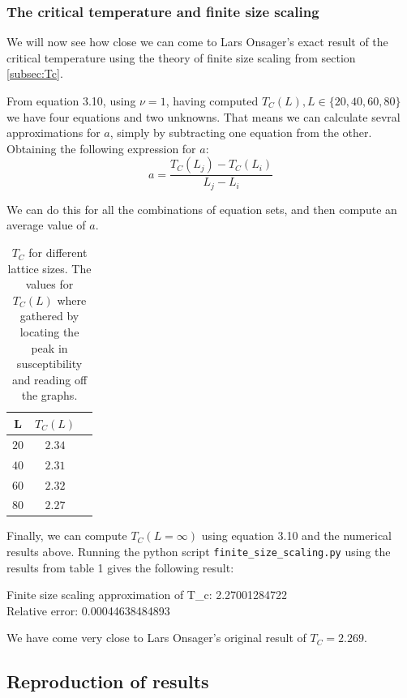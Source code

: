 \documentclass[11pt,a4paper,final]{article}
\numberwithin{equation}{section}
\begin{document}
\subsubsection{The critical temperature and finite size scaling}
We will now see how close we can come to Lars Onsager's exact result 
of the critical temperature using the theory of finite size scaling from 
section \ref{subsec:Tc}.

From equation 3.10, using $\nu = 1$, having computed $T_C(L), L \in \{20,40,60,80 \}$ we have four equations and two unknowns. That means we can calculate sevral approximations for $a$, simply by subtracting one equation from the other. Obtaining the following expression for $a$:
\begin{equation}
a = \frac{T_C(L_j)-T_C(L_i)}{L_j - L_i}
\end{equation}

 We can do this for all the combinations of equation sets, and then 
 compute an average value of $a$. 
\begin{table}[!h]
\caption{ $T_C$ for different lattice sizes. The values for $T_C (L)$ 
where gathered by locating the peak in susceptibility and reading off 
the graphs.  }
\begin{center}
\vspace{2mm}
\begin{tabular}{| c | c | c |}
	\hline
	L  & $T_C(L)$  \\		\hline		
	$20$ & $2.34$ \\
    $40$ & $2.31$ \\
    $60$ & $2.32$ \\
    $80$ & $2.27$ \\
  \hline
\end{tabular}
\end{center}
\end{table} 

Finally, we can compute $T_C(L=\infty)$ using equation 3.10 and the numerical results above. Running the python script \texttt{finite\_size\_scaling.py} using the results from table 1 gives the following result:

\begin{framed}
Finite size scaling approximation of T\_c:  2.27001284722 \\
Relative error:  0.00044638484893
\end{framed}

We have come very close to Lars Onsager's original result of
$T_C = 2.269$. 


\subsection{Reproduction of results}
\end{document}
